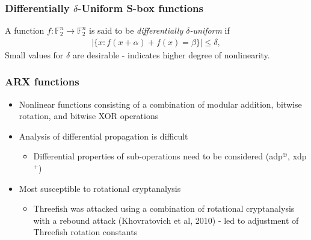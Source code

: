 \documentclass[handout]{beamer}
\newcommand{\field}[1]{\mathbb{#1}} %
\begin{document}
\begin{frame}
	\frametitle{Differentially $\delta$-Uniform S-box functions}
	A function $f : \field{F}_2^n \to \field{F}_2^n$ is said to be \emph{differentially $\delta$-uniform} if
	\begin{eqnarray*}
		|\{x : f(x + \alpha) + f(x) = \beta\}| \leq \delta,
	\end{eqnarray*}
	Small values for $\delta$ are desirable - indicates higher degree of nonlinearity.
\end{frame}

\begin{frame}
	\frametitle{ARX functions}
	\begin{itemize}
		\item Nonlinear functions consisting of a combination of modular addition, bitwise rotation, and bitwise XOR operations
		\item Analysis of differential propagation is difficult
		\begin{itemize}
			\item Differential properties of sub-operations need to be considered (adp$^{\oplus}$, xdp$^{+}$)
		\end{itemize}
		\item Most susceptible to rotational cryptanalysis
		\begin{itemize}
			\item Threefish was attacked using a combination of rotational cryptanalysis with a rebound attack (Khovratovich et al, 2010) - led to adjustment of Threefish rotation constants %
		\end{itemize}
	\end{itemize}
\end{frame}

\end{document}
